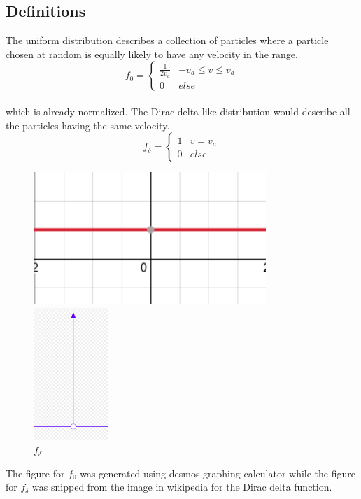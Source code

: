 \documentclass[12pt]{article}
\begin{document}
{	\subsection{Definitions}
	The uniform distribution describes a collection of particles where a particle chosen at random is equally likely to have any velocity in the range.
	\[ f_{0} = 
	\begin{cases} 
		\frac{1}{2 v_{a}} & -v_{a}\leq v\leq v_{a} \\
		0 & else 
	\end{cases}
	\] \\ which is already normalized. The Dirac delta-like distribution would describe all the particles having the same velocity.
	\[ f_{\delta} = 
	\begin{cases} 
		1 & v = v_{a} \\
		0 & else 
	\end{cases}
	\]
	\begin{figure}[H]
		\begin{multicols}{2}
			\includegraphics[width=\linewidth, height=5cm]{uniform.png} \caption{$f_{0}$} \par
			\includegraphics[width=\linewidth, height=5cm]{dirac.png} \caption{$f_{\delta}$} \par
		\end{multicols}
	\end{figure}
	The figure for $f_{0}$ was generated using desmos graphing calculator while the figure for $f_{\delta}$ was snipped from the image in wikipedia for the Dirac delta function. \\
	
}
\end{document}
